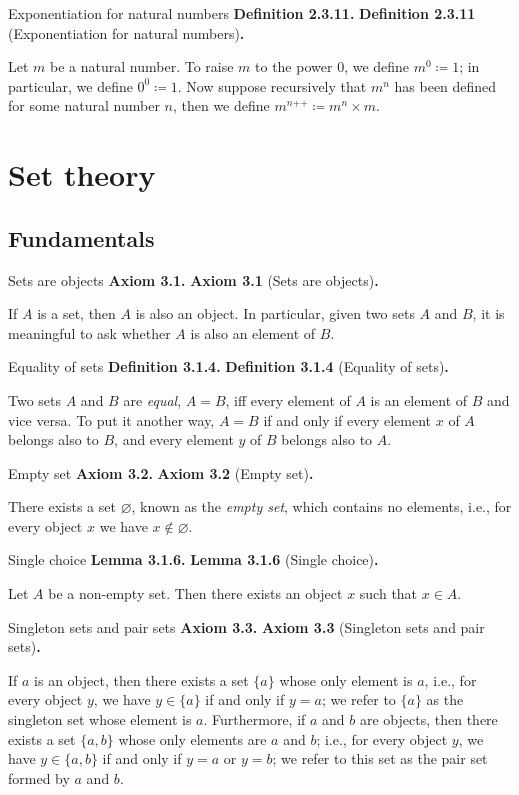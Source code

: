 \documentclass[12pt]{article}
\newcommand{\succr}[1]{#1 \textrm{++}}
\newenvironment{df}[2][\relax]{
\vspace{4mm}
    \noindent\setlength{\parskip}{1em}%
    \ifx#1\relax%
        \textbf{#2. }%
    \else%
        \textbf{#2} (#1)\textbf{. }%
    \fi%
    \ignorespaces%
}{}
\theoremstyle{remark}
\begin{document}
\begin{df}[Exponentiation for natural numbers]{Definition 2.3.11}
    Let $m$ be a natural number.
    To raise $m$ to the power $0$, we define $m^0 \coloneqq 1$; in particular, we define $0^0 \coloneqq 1$.
    Now suppose recursively that $m^n$ has been defined for some natural number $n$, then we define $m^{\succr{n}} \coloneqq m^n \times m$.
\end{df}


\pagebreak


\section{Set theory}
\subsection{Fundamentals}
\begin{df}[Sets are objects]{Axiom 3.1}
    If $A$ is a set, then $A$ is also an object.
    In particular, given two sets $A$ and $B$, it is meaningful to ask whether $A$ is also an element of $B$.
\end{df}


\begin{df}[Equality of sets]{Definition 3.1.4}
    Two sets $A$ and $B$ are \emph{equal}, $A = B$, iff every element of $A$ is an element of $B$ and vice versa.
    To put it another way, $A = B$ if and only if every element $x$ of $A$ belongs also to $B$, and every element $y$ of $B$ belongs also to $A$.
\end{df}


\begin{df}[Empty set]{Axiom 3.2}
    There exists a set $\varnothing$, known as the \emph{empty set}, which contains no elements, i.e., for every object $x$ we have $x \notin \varnothing$.
\end{df}


\begin{df}[Single choice]{Lemma 3.1.6}
    Let $A$ be a non-empty set.
    Then there exists an object $x$ such that $x \in A$.
\end{df}


\begin{df}[Singleton sets and pair sets]{Axiom 3.3}
    If $a$ is an object, then there exists a set $\{a\}$ whose only element is $a$, i.e., for every object $y$, we have $y \in \{ a \}$ if and only if $y = a$; we refer to $\{ a \}$ as the singleton set whose element is $a$.
    Furthermore, if $a$ and $b$ are objects, then there exists a set $\{a, b\}$ whose only elements are $a$ and $b$; i.e., for every object $y$, we have $y \in \{a, b\}$ if and only if $y = a$ or $y = b$; we refer to this set as the pair set formed by $a$ and $b$.
\end{df}
\end{document}
